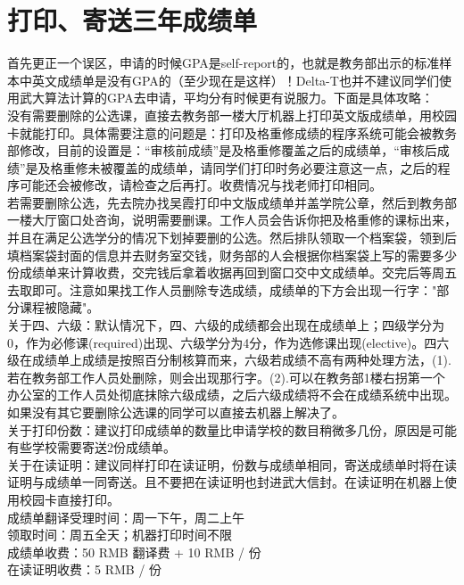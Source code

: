 \documentclass{article}
\begin{document}
\section{打印、寄送三年成绩单}
首先更正一个误区，申请的时候GPA是self-report的，也就是教务部出示的标准样本中英文成绩单是没有GPA的（至少现在是这样）！Delta-T也并不建议同学们使用武大算法计算的GPA去申请，平均分有时候更有说服力。下面是具体攻略：\\
\textcolor{colorname2}{没有需要删除的公选课}，直接去教务部一楼大厅机器上打印英文版成绩单，用校园卡就能打印。具体需要注意的问题是：打印及格重修成绩的程序系统可能会被教务部修改，目前的设置是：“审核前成绩”是及格重修覆盖之后的成绩单，“审核后成绩”是及格重修未被覆盖的成绩单，请同学们打印时务必要注意这一点，之后的程序可能还会被修改，请检查之后再打。收费情况与找老师打印相同。 \\
\textcolor{colorname2}{若需要删除公选}，先去院办找吴霞打印中文版成绩单并盖学院公章，然后到教务部一楼大厅窗口处咨询，说明需要删课。工作人员会告诉你把及格重修的课标出来，并且在满足公选学分的情况下划掉要删的公选。然后排队领取一个档案袋，领到后填档案袋封面的信息并去财务室交钱，财务部的人会根据你档案袋上写的需要多少份成绩单来计算收费，交完钱后拿着收据再回到窗口交中文成绩单。交完后等周五去取即可。注意如果找工作人员删除专选成绩，成绩单的下方会出现一行字："部分课程被隐藏"。 \\
\textcolor{colorname2}{关于四、六级}：默认情况下，四、六级的成绩都会出现在成绩单上；四级学分为0，作为必修课(required)出现、六级学分为4分，作为选修课出现(elective)。四六级在成绩单上成绩是按照百分制核算而来，六级若成绩不高有两种处理方法，(1). 若在教务部工作人员处删除，则会出现那行字。(2).可以在教务部1楼右拐第一个办公室的工作人员处彻底抹除六级成绩，之后六级成绩将不会在成绩系统中出现。如果没有其它要删除公选课的同学可以直接去机器上解决了。\\
\textcolor{colorname2}{关于打印份数}：建议打印成绩单的数量比申请学校的数目稍微多几份，原因是可能有些学校需要寄送2份成绩单。\\
\textcolor{colorname2}{关于在读证明}：建议同样打印在读证明，份数与成绩单相同，寄送成绩单时将在读证明与成绩单一同寄送。且不要把在读证明也封进武大信封。在读证明在机器上使用校园卡直接打印。\\
\textcolor{colorname2}{成绩单翻译受理时间}：周一下午，周二上午\\
\textcolor{colorname2}{领取时间}：周五全天；机器打印时间不限\\
\textcolor{colorname2}{成绩单收费}：50 RMB 翻译费 +  10 RMB / 份\\
\textcolor{colorname2}{在读证明收费}：5 RMB / 份\\
\end{document}
